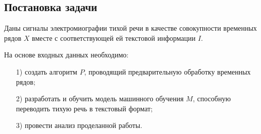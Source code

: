 \subsection{Постановка задачи}

Даны сигналы электромиографии тихой речи в качестве совокупности временных рядов $X$ вместе с соответствующей ей текстовой информации $I$.

На основе входных данных необходимо:

\vspace{0.5em-\topsep}
\begin{itemize}
    \setlength\itemsep{0em}
    \item[1)] создать алгоритм $P$, проводящий предварительную обработку временных рядов;
    \item[2)] разработать и обучить модель машинного обучения $M$, способную переводить тихую речь в текстовый формат;
    \item[3)] провести анализ проделанной работы.
\end{itemize}

